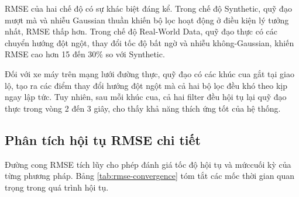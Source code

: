 RMSE của hai chế độ có sự khác biệt đáng kể. Trong chế độ Synthetic, quỹ đạo mượt mà và nhiễu Gaussian thuần khiến bộ lọc hoạt động ở điều kiện lý tưởng nhất, RMSE thấp hơn. Trong chế độ Real-World Data, quỹ đạo thực có các chuyển hướng đột ngột, thay đổi tốc độ bất ngờ và nhiễu không-Gaussian, khiến RMSE cao hơn 15 đến 30\% so với Synthetic.

Đối với xe máy trên mạng lưới đường thực, quỹ đạo có các khúc cua gắt tại giao lộ, tạo ra các điểm thay đổi hướng đột ngột mà cả hai bộ lọc đều khó theo kịp ngay lập tức. Tuy nhiên, sau mỗi khúc cua, cả hai filter đều hội tụ lại quỹ đạo thực trong vòng 2 đến 3 giây, cho thấy khả năng thích ứng tốt của hệ thống.

\subsection{Phân tích hội tụ RMSE chi tiết}

\hspace{0.5cm} Đường cong RMSE tích lũy cho phép đánh giá tốc độ hội tụ và mứccuối kỳ của từng phương pháp. Bảng \ref{tab:rmse-convergence} tóm tắt các mốc thời gian quan trọng trong quá trình hội tụ.

\begin{table}[H]
\centering
{}
\caption{RMSE tích lũy theo mốc thời gian (seed=42, 120 giây, 10 Hz)}
\label{tab:rmse-convergence}
\end{table}

